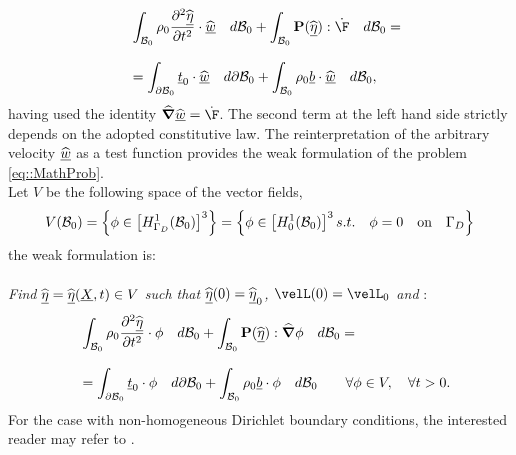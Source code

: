 \begin{equation}
  \begin{array}{lll} & \displaystyle
    \int_{\RefConE}\rho_0\frac{\partial^2 \displL}{\partial
      t^2}\cdot\velwE\quad d\RefConE +
    \int_{\RefConE}\Piola(\displL):\dot{\F}\quad d\RefConE = \\ \\ &
    \displaystyle = \int_{\partial
      \RefConE}\underline{t}_0\cdot\velwE\quad d\partial\RefConE +
    \int_{\RefConE}\rho_0 \underline{b}\cdot\velwE\quad d\RefConE,
  \end{array}
  \label{eq::secondIntegral}
\end{equation} having used the identity $\delOp\velwE = \dot{\F}$. The
second term at the left hand side strictly depends on the adopted
constitutive law. The reinterpretation of the arbitrary velocity
$\widehat{\underline{w}}$ as a test function provides the weak formulation of the
problem \eqref{eq::MathProb}.\\ Let $V$ be the following space of the
vector fields,
\begin{equation}
  V(\mathcal{B}_0)=\left\{\phi\in\left[H_{\Gamma_D}^1(\mathcal{B}_0)\right]^3\right\}=\left\{\phi\in\left[H_{0}^1(\mathcal{B}_0)\right]^3
    s.t. \quad \phi=0 \quad\text{on}\quad\Gamma_D\right\}
  \label{eq::TestSpace}
\end{equation} the weak formulation is:\\ \\ \textit{Find
  $\widehat{\underline{\eta}}=\widehat{\underline{\eta}}(\underline{X},t)\in V$ such that $\widehat{\underline{\eta}}(0)=\widehat{\underline{\eta}}_0$,
  $\velL(0)=\velL_0$ and} :
\begin{equation}
  \begin{array}{lll} & \displaystyle
    \int_{\mathcal{B}_0}\rho_0\frac{\partial^2 \widehat{\underline{\eta}}}{\partial
      t^2}\cdot\phi\quad d\mathcal{B}_0 +
    \int_{\mathcal{B}_0}\textbf{P}(\widehat{\underline{\eta}}):\widehat{\boldsymbol{\nabla}}\phi\quad d\mathcal{B}_0 = \\ \\ &
    \displaystyle = \int_{\partial \mathcal{B}_0}\underline{t}_0\cdot\phi\quad
    d\partial\mathcal{B}_0 + \int_{\mathcal{B}_0}\rho_0 \underline{b}\cdot\phi\quad
    d\mathcal{B}_0 \qquad \forall \phi\in V, \quad \forall t>0.
  \end{array}
  \label{eq::WF}
\end{equation} For the case with non-homogeneous Dirichlet boundary
conditions, the interested reader may refer to \cite{Hughes}.

